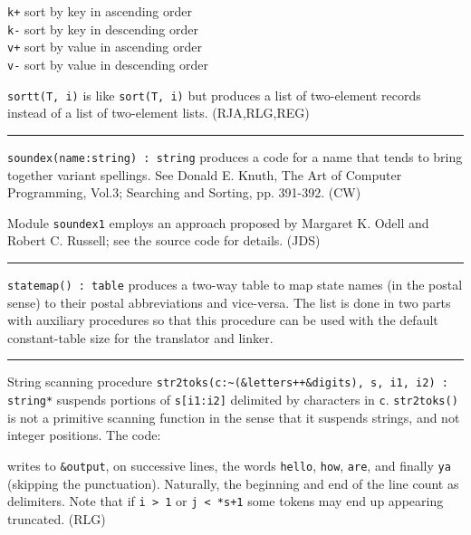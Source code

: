 \texttt{{\textquotedbl}k+{\textquotedbl}} sort by key in ascending
order\\
\texttt{{\textquotedbl}k-{\textquotedbl}} sort by key in descending
order\\
\texttt{{\textquotedbl}v+{\textquotedbl}} sort by value in ascending
order\\
\texttt{{\textquotedbl}v-{\textquotedbl}} sort by value in descending
order

\texttt{sortt}\texttt{(T, i)} is like \texttt{sort(T, i)}
but produces a list of two-element records instead of a list of
two-element lists. (RJA,RLG,REG)

\vspace{0.25cm}\hrule{}

\texttt{soundex(name:string) : string} produces a code for a name that
tends to bring together variant spellings. See Donald E. Knuth, The Art
of Computer Programming, Vol.3; Searching and Sorting, pp. 391-392.
(CW)

Module \texttt{soundex1} employs an approach proposed by Margaret K.
Odell and Robert C. Russell; see the source code for details. (JDS)

\vspace{0.25cm}\hrule{}

\texttt{statemap() : table} produces a
{\textquotedbl}two-way{\textquotedbl} table to map state names (in the postal sense) to their postal abbreviations
and vice-versa. The list is done in two parts with auxiliary procedures
so that this procedure can be used with the default constant-table size
for the translator and linker. 

\vspace{0.25cm}\hrule{}

String scanning procedure \texttt{str2toks(c:\~{}(\&letters++\&digits),
s, i1, i2) : string*} suspends portions of \texttt{s[i1:i2]} delimited
by characters in \texttt{c}. \texttt{str2toks()} is not a primitive
scanning function in the sense that it suspends strings, and not
integer positions. The code:


writes to \texttt{\&output}, on successive lines, the words
\texttt{{\textquotedbl}hello{\textquotedbl}},
\texttt{{\textquotedbl}how{\textquotedbl}},
\texttt{{\textquotedbl}are{\textquotedbl}}, and finally
\texttt{{\textquotedbl}ya{\textquotedbl}} (skipping the punctuation).
Naturally, the beginning and end of the line count as delimiters. Note
that if \texttt{i {\textgreater} 1} or \texttt{j {\textless} *s+1} some
tokens may end up appearing truncated. (RLG)

